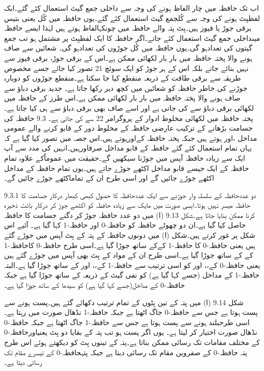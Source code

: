 	اب تک حافظہ میں چار الفاظ ہونے کی وجہ سے داخلی جمع گیٹ استعمال کئے گئے۔ایک لفظبِٹ ہونے کی وجہ سے کُلجمع گیٹ استعمال کئے گئے۔یوں حافظہ میں کُل یعنی بتیس برقی جوڑ یا فیوز ہیں۔بِٹ پتہ والے حافظہ میں چونکہالفاظ ہوتے ہیں لہٰذا ایسے حافظہ میںداخلی جمع گیٹ استعمال کئے جاتے۔اگر حافظہ کا ایک لفظبِٹ پر مشتمل ہو تب جمع گیتوں کی تعدادہو گی۔یوں حافظہ میں کُل جوڑوں کی تعدادہو گی۔
	شعائیں سے صاف ہونے والا پختہ حافظہ میں بار بار لکھائی ممکن ہے۔اس کے برقی جوڑ، برقی فیوز سے نہیں بنائے جاتے بلکہ اس کے ہر جوڑ کو ایک سوئچ 21 تصور کیا جائے جسے مخصوص طریقہ سے برقی طاقت کے ذریعہ منقطع کیا جا سکتا ہے۔منقطع جوڑوں کو دوبارہ جوڑنے کی خاطر حافظہ کو شعائیں میں کچھ دیر رکھا جاتا ہے۔
	جدید برقی دباؤ سے صاف ہونے والا پختہ حافظہ میں بار بار لکھائی ممکن ہے۔اس طرز کے حافظہ میں لکھائی برقی دباؤ سے کی جاتی ہے اور اسے صاف بھی برقی دباؤ سے ہی کیا جاتا ہے۔
	پختہ حافظہ میں لکھائی مخلوط ادوار کے پروگرامر 22 سے کی جاتی ہے۔
9.3 حافظہ کی جسامت بڑھانے کے ترکیب
	عارضی حافظہ کے مخلوط دور کے قابو کرنے والے عمومی مداخل ،اور ہوتے ہیں جبکہ پختہ حافظہ کےاورہوتے ہیں۔اس حصہ میں تصور کیا گیا ہے کہ یہاں تمام استعمال کئے گئے حافظہ کے قابو مداخل صرفاورہیں۔انہیں کی مدد سے آپ ایک سے زیادہ حافظہ آپس میں جوڑنا سیکھیں گے۔حقیقت میں عموماًکے علاوہ تمام حافظہ کے ایک جیسے قابو مداخل اکٹھے جوڑے جاتے ہیں۔یوں تمام حافظہ کے مداخل اکٹھے جوڑے جائیں گے اور اسی طرح ان کے تماماکٹھے جوڑے جائیں گے۔

9.3.1 دو عددحافظہ کے سلسلہ وار جوڑنے سے ایک عددحافظہ کا حصول
	کبھی کبھار درکار جسامت کا حافظہ میسر نہیں ہوتا۔ایسی صورت میں مایک سے زیادہ حافظہ کو اکٹھے جوڑ کر درکار بائٹ ذخیرہ کرنا ممکن بنایا جاتا ہے۔شکل 9.13 (ا) میں دو عدد حافظہ جوڑ کر دگنے جسامت کا حافظہ حاصل کیا گیا ہے۔ان دو چھوٹے حافظہ کو حافظہ-0 اور حافظہ-1 کہا گیا ہے۔ آئیے اس شکل پر غور کرتے ہیں۔شکل (ا) میں دونوں حافظہ کے پتہ کے بِٹ آپس میں جوڑے گئے ہیں یعنی حافظہ-0 کا حافظہ-1 کےکے ساتھ جوڑا گیا ہے۔اسی طرح حافظہ-0 کاحافظہ-1 کے کے ساتھ جوڑا گیا ہے۔اسی طرح ان کے مواد کے بِٹ بھی آپس میں جوڑے گئے ہیں یعنی حافظہ-0 کے،، اور کو اسی ترتیب سے حافظہ-1 کے،، اور کے ساتھ جوڑا گیا ہے۔البتہ حافظہ-1  کے مداخل (جسے کہا گیا ہے)  کو نفی گیٹ کے ذریعہ کے ساتھ جوڑا گیا ہے جبکہ حافظہ-0 کے  مداخل(جسے کہا گیا ہے) کو سیدھا  کے ساتھ جوڑا گیا ہے۔



	شکل 9.14 (ا) میں پتہ کے تین بِٹوں کے تمام ترتیب دکھائے گئے ہیں۔پست ہونے سے پست ہوتا ہے جس سے حافظہ-0  جاگ اٹھتا ہے جبکہ حافظہ-1 نڈھال صورت میں رہتا ہے۔اسی طرحبلند ہونے سے پست ہوتا ہے جس سے حافظہ-1  جاگ اٹھتا ہے جبکہ حافظہ-0 نڈھال صورت اختیار کر لیتا ہے۔
	یوں اگر پست ہو تب پتہ کے بقایا دو بِٹ یعنیاورحافظہ-0 کے مختلف مقامات تک رسائی ممکن بناتا ہے۔پتہ کے تینوں بِٹ کو دیکھتے ہوئے اس طرح پتہ حافظہ-0 کے صفرویں مقام تک رسائی دیتا ہے جبکہ پتہحافظہ-0 کے تیسرے مقام تک رسائی دیتا ہے۔


